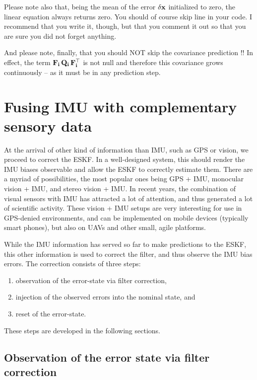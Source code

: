 Please note also that, being the mean of the error $\delta{\bf x}$ initialized to zero, the linear equation  always returns zero. 
You should of course skip line  in your code. 
I recommend that you write it, though, but that you comment it out so that you are sure you did not forget anything.

And please note, finally, that you should NOT skip the covariance prediction !! In effect, the term ${\bf F}_{\bf i}\,{\bf Q}_{\bf i}\,{\bf F}_{\bf i}^{\top}$ is not null and therefore this covariance grows continuously -- as it must be in any prediction step.


\section{Fusing IMU with complementary sensory data}
\label{sec:fusion}

At the arrival of other kind of information than IMU, such as GPS or vision, we proceed to correct the ESKF. 
In a well-designed system, this should render the IMU biases observable and allow the ESKF to correctly estimate them. 
There are a myriad of possibilities, the most popular ones being GPS + IMU, monocular vision + IMU, and stereo vision + IMU. 
In recent years, the combination of visual sensors with IMU has attracted a lot of attention, and thus generated a lot of scientific activity. 
These vision + IMU setups are very interesting for use in GPS-denied environments, and can be implemented on mobile devices (typically smart phones), but also on UAVs and other small, agile platforms.

\bigskip

While the IMU information has served so far to make predictions to the ESKF, this other information is used to correct the filter, and thus observe the IMU bias errors. 
The correction consists of three steps:
\begin{enumerate}
\item
 observation of the error-state via filter correction, 
\item
 injection of the observed errors into the nominal state, and
\item	
 reset of the error-state. 
\end{enumerate}%
%
These steps are developed in the following sections.

\subsection{Observation of the error state via filter correction}

